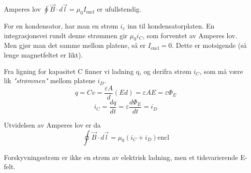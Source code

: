 Amperes lov $\oint\vec{B}\cdot d\vec{l}=\mu_0I_{\text{encl}}$ er ufullstendig.

For en kondensator, har man en strøm $i_c$ inn til kondensatorplaten.
En integrasjonsvei rundt denne strømmen gir $\mu_0i_C$,
som forventet av Amperes lov.
Men gjør man det samme mellom platene, så er $I_{\text{encl}}=0$.
Dette er motsigende (så lenge magnetfeltet er likt).

Fra ligning for kapasitet C finner vi ladning q, og derifra strøm $i_C$,
som må være lik \emph{"strømmen"} mellom platene $i_D$.
$$q = Cv
  = \frac{\varepsilon A}{d}(Ed)
  = \varepsilon AE
  = \varepsilon \Phi_E$$
$$i_C = \frac{dq}{dt}
  = \varepsilon \frac{d\Phi_E}{dt}
  = i_D$$

Utvidelsen av Amperes lov er da
$$\oint\vec{B}\cdot d\vec{l}=\mu_0(i_C+i_D){\text{encl}}$$

Forskyvningsstrøm er ikke en strøm av elektrisk ladning,
men et tidsvarierende E-felt.
